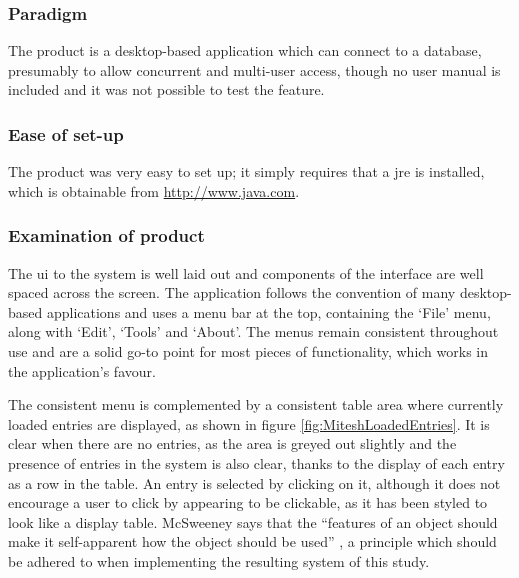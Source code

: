 \subsubsection{Paradigm}
The product is a desktop-based application which can connect to a database, presumably to allow concurrent and multi-user access, though no user manual is included and it was not possible to test the feature.

\subsubsection{Ease of set-up}
The product was very easy to set up; it simply requires that a \gls{jre} is installed, which is obtainable from \url{http://www.java.com}.

\subsubsection{Examination of product}
The \gls{ui} to the system is well laid out and components of the interface are well spaced across the screen. The application follows the convention of many desktop-based applications and uses a menu bar at the top, containing the `File' menu, along with `Edit', `Tools' and `About'.  The menus remain consistent throughout use and are a solid go-to point for most pieces of functionality, which works in the application's favour.

The consistent menu is complemented by a consistent table area where currently loaded entries are displayed, as shown in figure \ref{fig:MiteshLoadedEntries}.  It is clear when there are no entries, as the area is greyed out slightly and the presence of entries in the system is also clear, thanks to the display of each entry as a row in the table.  An entry is selected by clicking on it, although it does not encourage a user to click by appearing to be clickable, as it has been styled to look like a display table.  McSweeney says that the ``features of an object should make it self-apparent how the object should be used'' \cite{affordance}, a principle which should be adhered to when implementing the resulting system of this study.

